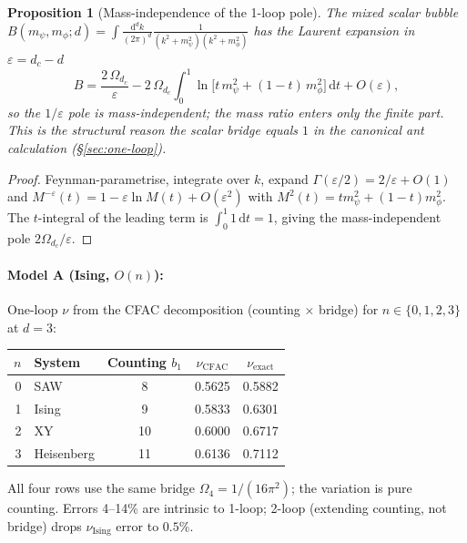 \documentclass[10pt,a4paper,twocolumn]{article}
\newcommand{\dd}{\mathrm{d}}
\newtheorem{proposition}[theorem]{Proposition}
\theoremstyle{definition}
\begin{document}

\begin{proposition}[Mass-independence of the 1-loop pole]
\label{prop:mass-indep-thm}
The mixed scalar bubble
$B(m_\psi, m_\phi; d) = \int \frac{\dd^d k}{(2\pi)^d}
\frac{1}{(k^2 + m_\psi^2)(k^2 + m_\phi^2)}$
has the Laurent expansion in $\varepsilon = d_c - d$
\begin{equation}
  B = \frac{2\,\Omega_{d_c}}{\varepsilon}
  - 2\,\Omega_{d_c}\int_0^1\!\ln\bigl[
    t\,m_\psi^2 + (1{-}t)\,m_\phi^2\bigr]\,\dd t
  + O(\varepsilon),
\end{equation}
so the $1/\varepsilon$ pole is mass-independent; the mass ratio
enters only the finite part.  This is the structural reason the
scalar bridge equals $1$ in the canonical ant calculation
(\S\ref{sec:one-loop}).
\end{proposition}

\begin{proof}
Feynman-parametrise, integrate over $k$, expand
$\Gamma(\varepsilon/2) = 2/\varepsilon + O(1)$ and
$M^{-\varepsilon}(t) = 1 - \varepsilon\ln M(t) + O(\varepsilon^2)$
with $M^2(t) = t m_\psi^2 + (1{-}t) m_\phi^2$.  The
$t$-integral of the leading term is $\int_0^1 1\,\dd t = 1$,
giving the mass-independent pole $2\Omega_{d_c}/\varepsilon$.
\end{proof}

\iffalse

\paragraph{Model A (Ising, $O(n)$):}
One-loop $\nu$ from the CFAC decomposition (counting $\times$
bridge) for $n \in \{0,1,2,3\}$ at $d=3$:
\begin{center}
\small
\begin{tabular}{@{}rlccc@{}}
\toprule
$n$ & System & Counting $b_1$ & $\nu_{\text{CFAC}}$ &
  $\nu_{\text{exact}}$ \\
\midrule
0 & SAW         & 8  & 0.5625 & 0.5882 \\
1 & Ising       & 9  & 0.5833 & 0.6301 \\
2 & XY          & 10 & 0.6000 & 0.6717 \\
3 & Heisenberg  & 11 & 0.6136 & 0.7112 \\
\bottomrule
\end{tabular}
\end{center}
All four rows use the same bridge $\Omega_4 = 1/(16\pi^2)$; the
variation is pure counting.  Errors 4--14\% are intrinsic to
1-loop; 2-loop (extending counting, not bridge) drops
$\nu_{\text{Ising}}$ error to $0.5\%$.
\end{document}
